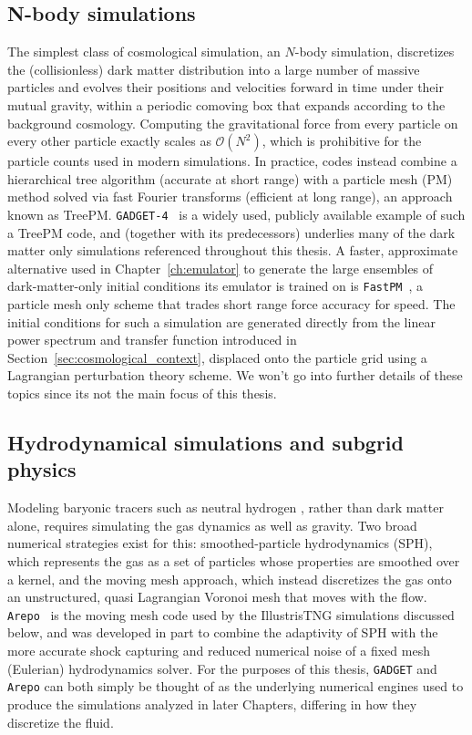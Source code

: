 \subsection{N-body simulations}

The simplest class of cosmological simulation, an $N$-body simulation, discretizes the (collisionless) dark matter distribution into a large number of massive particles and evolves their positions and velocities forward in time under their mutual gravity, within a periodic comoving box that expands according to the background cosmology. Computing the gravitational force from every particle on every other particle exactly scales as $\mathcal{O}(N^2)$, which is prohibitive for the particle counts used in modern simulations. In practice, codes instead combine a hierarchical tree algorithm (accurate at short range) with a particle mesh (PM) method solved via fast Fourier transforms (efficient at long range), an approach known as TreePM. \texttt{GADGET-4}~\citep{springel_simulating_2021} is a widely used, publicly available example of such a TreePM code, and (together with its predecessors) underlies many of the dark matter only simulations referenced throughout this thesis. A faster, approximate alternative  used in Chapter~\ref{ch:emulator} to generate the large ensembles of dark-matter-only initial conditions its emulator is trained on is \texttt{FastPM}~\citep{feng_fastpm_2016}, a particle mesh only scheme that trades short range force accuracy for speed. The initial conditions for such a simulation are generated directly from the linear power spectrum and transfer function introduced in Section~\ref{sec:cosmological_context}, displaced onto the particle grid using a Lagrangian perturbation theory scheme. We won't go into further details of these topics since its not the main focus of this thesis.

\subsection{Hydrodynamical simulations and subgrid physics}

Modeling baryonic tracers such as neutral hydrogen , rather than dark matter alone, requires simulating the gas dynamics as well as gravity. Two broad numerical strategies exist for this: smoothed-particle hydrodynamics (SPH), which represents the gas as a set of particles whose properties are smoothed over a kernel, and the moving mesh approach, which instead discretizes the gas onto an unstructured, quasi Lagrangian Voronoi mesh that moves with the flow. \texttt{Arepo}~\citep{weinberger_arepo_2020} is the moving mesh code used by the IllustrisTNG simulations discussed below, and was developed in part to combine the adaptivity of SPH with the more accurate shock capturing and reduced numerical noise of a fixed mesh (Eulerian) hydrodynamics solver. For the purposes of this thesis, \texttt{GADGET} and \texttt{Arepo} can both simply be thought of as the underlying numerical engines used to produce the simulations analyzed in later Chapters, differing in how they discretize the fluid.

